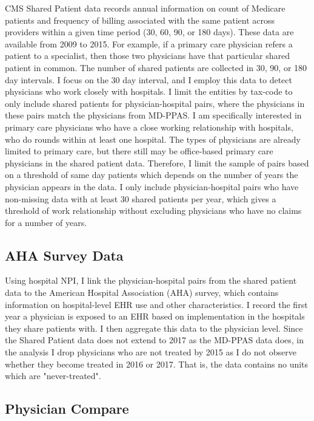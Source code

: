 \documentclass[12pt]{article}
\begin{document}
CMS Shared Patient data records annual information on count of Medicare patients and frequency of billing associated with the same patient across providers within a given time period (30, 60, 90, or 180 days). These data are available from 2009 to 2015. For example, if a primary care physician refers a patient to a specialist, then those two physicians have that particular shared patient in common. The number of shared patients are collected in 30, 90, or 180 day intervals. I focus on the 30 day interval, and I employ this data to detect physicians who work closely with hospitals. I limit the entities by tax-code to only include shared patients for physician-hospital pairs, where the physicians in these pairs match the physicians from MD-PPAS. I am specifically interested in primary care physicians who have a close working relationship with hospitals, who do rounds within at least one hospital. The types of physicians are already limited to primary care, but there still may be office-based primary care physicians in the shared patient data. Therefore, I limit the sample of pairs based on a threshold of same day patients which depends on the number of years the physician appears in the data. I only include physician-hospital pairs who have non-missing data with at least 30 shared patients per year, which gives a threshold of work relationship without excluding physicians who have no claims for a number of years.

\subsection{AHA Survey Data}

Using hospital NPI, I link the physician-hospital pairs from the shared patient data to the American Hospital Association (AHA) survey, which contains information on hospital-level EHR use and other characteristics. I record the first year a physician is exposed to an EHR based on implementation in the hospitals they share patients with. I then aggregate this data to the physician level. Since the Shared Patient data does not extend to 2017 as the MD-PPAS data does, in the analysis I drop physicians who are not treated by 2015 as I do not observe whether they become treated in 2016 or 2017. That is, the data contains no units which are "never-treated".

\subsection{Physician Compare}
\end{document}
